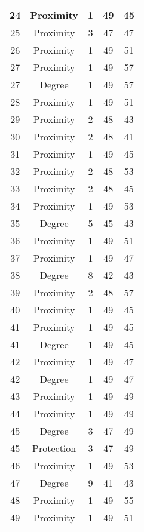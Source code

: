 \documentclass[results.tex]{subfiles}
\begin{document}
\begin{center}
\begin{tabular}{| c || c | c | c | c |}
    \hline
    24 & Proximity & 1 & 49 & 45 \\ 
    \hline
    25 & Proximity & 3 & 47 & 47 \\ 
    \hline
    26 & Proximity & 1 & 49 & 51 \\ 
    \hline
    27 & Proximity & 1 & 49 & 57 \\ 
    \hline
    27 & Degree & 1 & 49 & 57 \\ 
    \hline
    28 & Proximity & 1 & 49 & 51 \\ 
    \hline
    29 & Proximity & 2 & 48 & 43 \\ 
    \hline
    30 & Proximity & 2 & 48 & 41 \\ 
    \hline
    31 & Proximity & 1 & 49 & 45 \\ 
    \hline
    32 & Proximity & 2 & 48 & 53 \\ 
    \hline
    33 & Proximity & 2 & 48 & 45 \\ 
    \hline
    34 & Proximity & 1 & 49 & 53 \\ 
    \hline
    35 & Degree & 5 & 45 & 43 \\ 
    \hline
    36 & Proximity & 1 & 49 & 51 \\ 
    \hline
    37 & Proximity & 1 & 49 & 47 \\ 
    \hline
    38 & Degree & 8 & 42 & 43 \\ 
    \hline
    39 & Proximity & 2 & 48 & 57 \\ 
    \hline
    40 & Proximity & 1 & 49 & 45 \\ 
    \hline
    41 & Proximity & 1 & 49 & 45 \\ 
    \hline
    41 & Degree & 1 & 49 & 45 \\ 
    \hline
    42 & Proximity & 1 & 49 & 47 \\ 
    \hline
    42 & Degree & 1 & 49 & 47 \\ 
    \hline
    43 & Proximity & 1 & 49 & 49 \\ 
    \hline
    44 & Proximity & 1 & 49 & 49 \\ 
    \hline
    45 & Degree & 3 & 47 & 49 \\ 
    \hline
    45 & Protection & 3 & 47 & 49 \\ 
    \hline
    46 & Proximity & 1 & 49 & 53 \\ 
    \hline
    47 & Degree & 9 & 41 & 43 \\ 
    \hline
    48 & Proximity & 1 & 49 & 55 \\ 
    \hline
    49 & Proximity & 1 & 49 & 51 \\ 
    \hline   \end{tabular}
\end{center}
\end{document}
